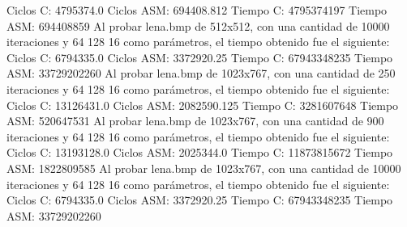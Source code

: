 \documentclass[10pt, a4paper]{article}
\begin{document}
\begin{itemize}
Ciclos C:                 4795374.0\newline
Ciclos ASM:               694408.812\newline
\newline
Tiempo C:                 4795374197\newline
Tiempo ASM:               694408859\newline
\newline
Al probar lena.bmp de 512x512, con una cantidad de 10000 iteraciones y 64 128 16 como parámetros, el tiempo obtenido fue el siguiente: \newline
Ciclos C:                 6794335.0\newline
Ciclos ASM:               3372920.25\newline
\newline
Tiempo C:                 67943348235\newline
Tiempo ASM:               33729202260\newline
\newline
Al probar lena.bmp de 1023x767, con una cantidad de 250 iteraciones y 64 128 16 como parámetros, el tiempo obtenido fue el siguiente: \newline
Ciclos C:                 13126431.0\newline
Ciclos ASM:               2082590.125\newline
\newline
Tiempo C:                 3281607648\newline
Tiempo ASM:               520647531\newline
\newline
Al probar lena.bmp de 1023x767, con una cantidad de 900 iteraciones y 64 128 16 como parámetros, el tiempo obtenido fue el siguiente: \newline
Ciclos C:                 13193128.0\newline
Ciclos ASM:               2025344.0\newline
\newline
Tiempo C:                 11873815672\newline
Tiempo ASM:               1822809585\newline
\newline
Al probar lena.bmp de 1023x767, con una cantidad de 10000 iteraciones y 64 128 16 como parámetros, el tiempo obtenido fue el siguiente: \newline
Ciclos C:                 6794335.0\newline
Ciclos ASM:               3372920.25\newline
\newline
Tiempo C:                 67943348235\newline
Tiempo ASM:               33729202260\newline



\end{itemize}
\end{document}
